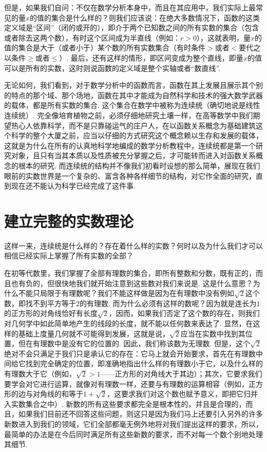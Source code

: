 \documentclass[color=cyan,mathpazo,titlestyle=hang]{elegantbook_mac}
\begin{document}
但是，如果我们自问：不仅在数学分析本身中，而且在其应用中，我们实际上最常见的量$x$的值的集合是什么样的？则我们应该说：在绝大多数情况下，函数的这类定义域是``区间''（闭的或开的），即介于两个已知数之间的所有实数的集合（包含或者除去这两个数），有时这个区间成为半直线（例如：$r>0$），这就表明，量$x$的值的集合是大于（或者小于）某个数的所有实数集合（有时条件$>$或者$<$要代之以条件$\geqslant$或者$\leqslant$）. 最后，还有这样的情形，即区间变成为整个直线，即量$x$的值可以是所有的实数，这时则说函数的定义域是整个实轴或者``数直线''. 

无论如何，我们看到，对于数学分析中的函数而言，函数在其上发展且展示其个别的特点的那个域、那个场地，函数在其中才能成为自然科学和技术的强大数学武器的载体，都是所有实数的集合. 这个集合在数学中被称为连续统（确切地说是线性连续统）. 完全像培育植物之前，必须仔细地研究土壤一样，在高等数学中我们期望热心人依靠科学，而不是只靠碰运气的庄户人，在以函数关系概念为基础建筑这个科学的整个大厦之前，应当以仔细的方式研究这个概念赖以生存和发展的载体，这就是为什么在所有的认真地科学地编成的数学分析教程中，连续统都是第一个研究对象，且只有当其本质以及性质被充分掌握之后，才可能转而进入对函数关系概念的根本的研究. 而连续统的结构并不像我们初看时设想的那么简单，展现在我们眼前的实数世界是一个复杂的、富含各种各样细节的结构，对它作全面的研究，直到现在还不能认为科学已经完成了这件事. 

\section{建立完整的实数理论}

这样一来，连续统是什么样的？存在着什么样的实数？何时以及为什么我们才可以相信已经实际上掌握了所有实数的全部？

在初等代数里，我们掌握了全部有理数的集合，即所有整数和分数，既有正的，而且也有负的，但很快地我们就开始注意到这些数对我们来说是. 这是什么意思？为什么不能只局限于有理数呢？我们不能这样做是因为在有理数中没有例如$\sqrt{2}$这个数，即找不到平方等于$2$的有理数. 而为什么必须有这样的数呢？因为就是连长为$1$的正方形的对角线恰好有长度$\sqrt{2}$，因而，如果我们否定了这个数的存在，则我们对几何学中如此简单地产生的线段的长度，就不能以任何数来表达了. 显然，在这样的基础上度量几何就不可能得到发展，这就是说，$\sqrt{2}$应当在实数中找到其位置，但在有理数中是没有它的位置的. 因此，我们称该数为无理数. 但是，这个$\sqrt{2}$绝对不会只满足于我们只是承认它的存在：它马上就会开始要求，首先在有理数中间给它找到完全确定的位置，即准确地指出什么样的有理数小于它，以及什么样的有理数大于它（例如，$\sqrt{2}>1$——正方形的对角线大于其边）；其次，它要求我们要学会对它进行运算，就像对有理数一样，还要与有理数的运算相容（例如，正方形的边与对角线的和等于$1+\sqrt{2}$，这要求我们对这个数也赋予意义，即把它归并入实数集合之中）. 新数的所有这些要求都完全是根本性的，并且是合理的，而且，如果我们目前还不回答这些问题，则这只是因为我们马上还要引入另外的许多新数进入到我们的领域，它们全部都毫无例外地将对我们提出这样的要求，所以，最简单的办法是在今后同时满足所有这些新数的要求，而不对每一个数个别地处理其细节. 
\end{document}
